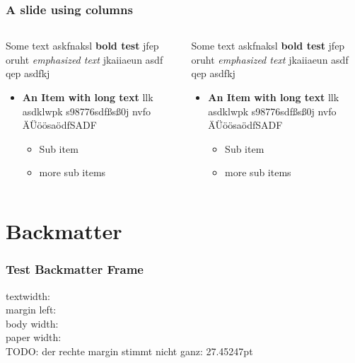 \documentclass[german,aspectratio=169,notoc,titlestyle=tud,draft]{tudbeamer}%
\begin{document}
\begin{frame}
	\frametitle{A slide using columns}
	\begin{columns}
	   	\begin{column}{.5\textwidth}
	   		Some text askfnaksl \textbf{bold test} jfep oruht \emph{emphasized text} jkaiiaeun asdf qep  asdfkj  
	   		\begin{itemize}
	   			\item \textbf{An Item with long text} llk asdklwpk s98776sdfßsß0j nvfo ÄÜöösaödfSADF
	   			\begin{itemize}
	   				\item Sub item
	   				\item more sub items
	   			\end{itemize}
	   		\end{itemize}
		\end{column}
	   	\begin{column}{.5\textwidth}
	   		Some text askfnaksl \textbf{bold test} jfep oruht \emph{emphasized text} jkaiiaeun asdf qep  asdfkj  
	   		\begin{itemize}
	   			\item \textbf{An Item with long text} llk asdklwpk s98776sdfßsß0j nvfo ÄÜöösaödfSADF
	   			\begin{itemize}
	   				\item Sub item
	   				\item more sub items
	   			\end{itemize}
	   		\end{itemize}
		\end{column}
	\end{columns}
\end{frame}

%
%

\makeatletter
\disableSectionFrame%
\section*{Backmatter}
\begin{finalframe}
	\frametitle*{Test Backmatter Frame}

	textwidth: \the\textwidth\\
	margin left: \the\bodyx\\
	body width: \the\bodywidth\\
	paper width: \the\beamer@paperwidth\\

	TODO: der rechte margin stimmt nicht ganz: 27.45247pt

\end{finalframe}
\makeatother
\end{document}

